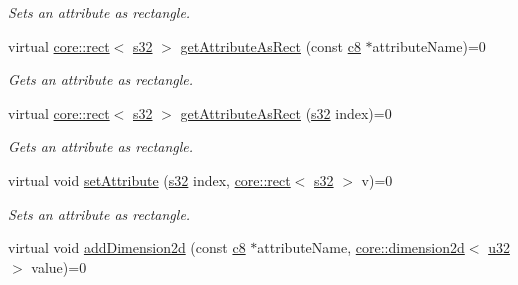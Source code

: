 \begin{DoxyCompactItemize}
\begin{DoxyCompactList}\small\item\em Sets an attribute as rectangle. \end{DoxyCompactList}\item 
virtual \hyperlink{classirr_1_1core_1_1rect}{core\+::rect}$<$ \hyperlink{namespaceirr_ac66849b7a6ed16e30ebede579f9b47c6}{s32} $>$ \hyperlink{classirr_1_1io_1_1IAttributes_ac2d077105e2e7c263ea181f67a005cc2}{get\+Attribute\+As\+Rect} (const \hyperlink{namespaceirr_a9395eaea339bcb546b319e9c96bf7410}{c8} $\ast$attribute\+Name)=0
\begin{DoxyCompactList}\small\item\em Gets an attribute as rectangle. \end{DoxyCompactList}\item 
virtual \hyperlink{classirr_1_1core_1_1rect}{core\+::rect}$<$ \hyperlink{namespaceirr_ac66849b7a6ed16e30ebede579f9b47c6}{s32} $>$ \hyperlink{classirr_1_1io_1_1IAttributes_af8efe18246d51e968da7d6380515dcd1}{get\+Attribute\+As\+Rect} (\hyperlink{namespaceirr_ac66849b7a6ed16e30ebede579f9b47c6}{s32} index)=0
\begin{DoxyCompactList}\small\item\em Gets an attribute as rectangle. \end{DoxyCompactList}\item 
\mbox{\label{classirr_1_1io_1_1IAttributes_a30f5097b085ad4c60d118028ee9384ec}} 
virtual void \hyperlink{classirr_1_1io_1_1IAttributes_a30f5097b085ad4c60d118028ee9384ec}{set\+Attribute} (\hyperlink{namespaceirr_ac66849b7a6ed16e30ebede579f9b47c6}{s32} index, \hyperlink{classirr_1_1core_1_1rect}{core\+::rect}$<$ \hyperlink{namespaceirr_ac66849b7a6ed16e30ebede579f9b47c6}{s32} $>$ v)=0
\begin{DoxyCompactList}\small\item\em Sets an attribute as rectangle. \end{DoxyCompactList}\item 
\mbox{\label{classirr_1_1io_1_1IAttributes_a6ed7b4304a6aee37ecff2d51f9b56443}} 
virtual void \hyperlink{classirr_1_1io_1_1IAttributes_a6ed7b4304a6aee37ecff2d51f9b56443}{add\+Dimension2d} (const \hyperlink{namespaceirr_a9395eaea339bcb546b319e9c96bf7410}{c8} $\ast$attribute\+Name, \hyperlink{classirr_1_1core_1_1dimension2d}{core\+::dimension2d}$<$ \hyperlink{namespaceirr_a0416a53257075833e7002efd0a18e804}{u32} $>$ value)=0

\end{DoxyCompactItemize}
